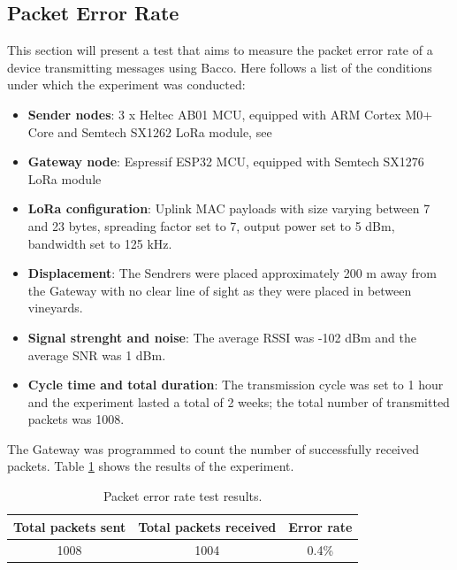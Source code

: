 \subsection{Packet Error Rate}
This section will present a test that aims to measure the packet error rate of a device transmitting messages using
Bacco. Here follows a list of the conditions under which the experiment was conducted:
\begin{itemize}
    \item \textbf{Sender nodes}: 3 x Heltec AB01 MCU, equipped with ARM Cortex M0+ Core and Semtech SX1262 LoRa module,
        see \cite{ab01}
    \item \textbf{Gateway node}: Espressif ESP32 MCU, equipped with Semtech SX1276 LoRa module
    \item \textbf{LoRa configuration}: Uplink MAC payloads with size varying between 7 and 23 bytes, spreading factor set to 7,
        output power set to 5 dBm, bandwidth set to 125 kHz.
    \item \textbf{Displacement}: The Sendrers were placed approximately 200 m away from the Gateway with no clear line
        of sight as they were placed in between vineyards.
    \item \textbf{Signal strenght and noise}: The average \gls{RSSI} was -102 dBm and the average \gls{SNR} was 1 dBm.
    \item \textbf{Cycle time and total duration}: The transmission cycle was set to 1 hour and the experiment
        lasted a total of 2 weeks; the total number of transmitted packets was 1008.
\end{itemize}
The Gateway was programmed to count the number of successfully received packets. Table \ref{tab: error rate results}
shows the results of the experiment.
\begin{table}[ht]
    \caption{Packet error rate test results.}
    \label{tab: error rate results}
    \centering
    \setlength{\extrarowheight}{7pt}
    \begin{tabular}{ |c|c|c| }
        \hline
        \textbf{Total packets sent} & \textbf{Total packets received} & \textbf{Error rate}\\
        \hline
        1008 & 1004 & 0.4\%\\
        \hline
    \end{tabular}
\end{table}

